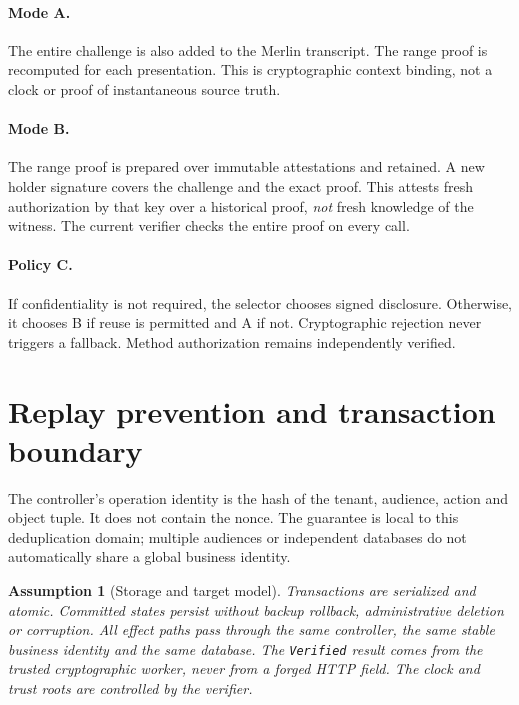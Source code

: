 \documentclass[11pt,a4paper]{article}
\newtheorem{assumption}[theorem]{Assumption}
\newcommand{\code}[1]{\nolinkurl{#1}}
\begin{document}
\paragraph{Mode A.} The entire challenge is also added to the Merlin
transcript. The range proof is recomputed for each presentation. This is
cryptographic context binding, not a clock or proof of instantaneous
source truth.
\paragraph{Mode B.} The range proof is prepared over immutable attestations
and retained. A new holder signature covers the challenge and the exact
proof. This attests fresh authorization by that key over a historical proof,
\emph{not} fresh knowledge of the witness. The current verifier checks the
entire proof on every call.
\paragraph{Policy C.} If confidentiality is not required, the selector
chooses signed disclosure. Otherwise, it chooses B if reuse is permitted
and A if not. Cryptographic rejection never triggers a fallback.
Method authorization remains independently verified.

\section{Replay prevention and transaction boundary}
The controller's operation identity is the hash of the tenant, audience,
action and object tuple. It does not contain the nonce. The guarantee is local
to this deduplication domain; multiple audiences or independent databases do
not automatically share a global business identity.

\begin{assumption}[Storage and target model]
Transactions are serialized and atomic. Committed states persist without
backup rollback, administrative deletion or corruption.
All effect paths pass through the same controller, the same stable business
identity and the same database. The \code{Verified} result comes from the
trusted cryptographic worker, never from a forged HTTP field.
The clock and trust roots are controlled by the verifier.
\end{assumption}
\end{document}
